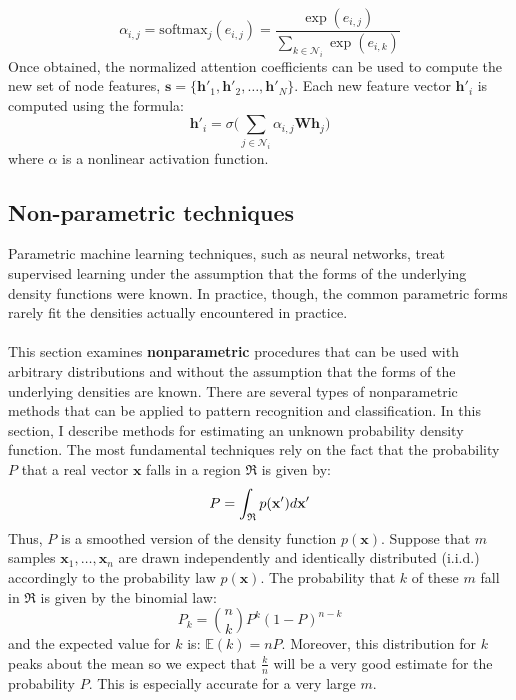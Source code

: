 	\begin{equation}
		\alpha_{i,j} = \text{softmax}_j(e_{i,j}) = \frac{\exp(e_{i,j})}{\sum_{k\in \mathcal{N}_i} \exp(e_{i,k})}
	\end{equation}
	Once obtained, the normalized attention coefficients can be used to compute the new set of node features, $\mathbf{s} = \{ \mathbf{h'}_1, \mathbf{h'}_2, \dots , \mathbf{h'}_N  \}$. Each new feature vector $\mathbf{h'}_i$ is computed using the formula:
	\begin{equation}
		\mathbf{h'}_i = \sigma \Bigg( \sum_{j \in \mathcal{N}_i} \alpha_{i,j} \mathbf{W} \mathbf{h}_j \Bigg) 
	\end{equation}
	where $\alpha$ is a nonlinear activation function. 
	\subsection{Non-parametric techniques}	
	Parametric machine learning techniques, such as neural networks, treat supervised learning under the assumption that the forms of the underlying density functions were known. In practice, though, the common parametric forms rarely fit the densities actually encountered in practice. 
	\\ \\
	This section examines \textbf{nonparametric} procedures that can be used with arbitrary distributions and without the assumption that the forms of the underlying densities are known. There are several types of nonparametric methods that can be applied to pattern recognition and classification. In this section, I describe methods for estimating an unknown probability density function. The most fundamental techniques rely on the fact that the probability $P$ that a real vector $\mathbf{x}$ falls in a region $\mathfrak{R}$ is given by:
	\begin{equation}
		\centering
		P = \int_{\mathfrak{R}} p(\mathbf{x'}) d\mathbf{x'}
	\end{equation}
	Thus, $P$ is a smoothed version of the density function $p(\mathbf{x})$. Suppose that $m$ samples $\mathbf{x}_1,\dots ,\mathbf{x}_n$ are drawn independently and identically distributed (i.i.d.) accordingly to the probability law $p(\mathbf{x})$. The probability that $k$ of these $m$ fall in $\mathfrak{R}$ is given by the binomial law:
	\begin{equation}
		P_k = {n\choose k} P^k (1-P)^{n-k}
	\end{equation}
	and the expected value for $k$ is: $\mathbb{E}(k) = nP$. Moreover, this distribution for $k$ peaks about the mean so we expect that $\frac{k}{n}$ will be a very good estimate for the probability $P$. This is especially accurate for a very large $m$. 
